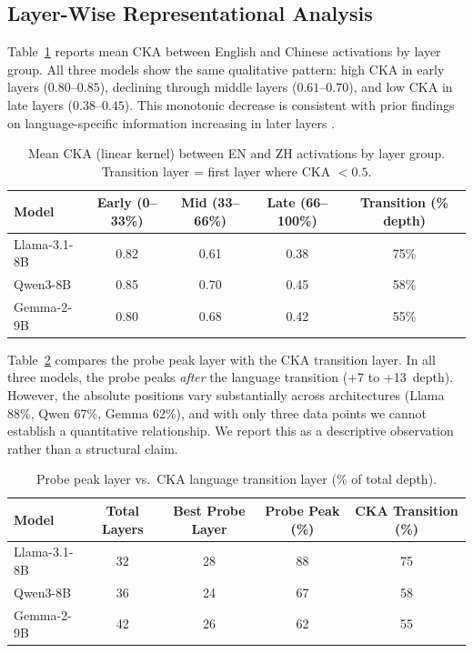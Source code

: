 \documentclass[11pt]{article}
\newcommand{\pp}{\,\text{pp}}
\begin{document}
\subsection{Layer-Wise Representational Analysis}
\label{sec:cka}

Table~\ref{tab:cka} reports mean CKA between English and Chinese activations by layer group.
All three models show the same qualitative pattern: high CKA in early layers ($0.80$--$0.85$), declining through middle layers ($0.61$--$0.70$), and low CKA in late layers ($0.38$--$0.45$).
This monotonic decrease is consistent with prior findings on language-specific information increasing in later layers \citep{libovicky2020language}.

\begin{table}[t]
\centering
\caption{Mean CKA (linear kernel) between EN and ZH activations by layer group. Transition layer = first layer where CKA $< 0.5$.}
\label{tab:cka}
\begin{tabular}{lcccc}
\toprule
Model & Early (0--33\%) & Mid (33--66\%) & Late (66--100\%) & Transition (\% depth) \\
\midrule
Llama-3.1-8B & 0.82 & 0.61 & 0.38 & 75\% \\
Qwen3-8B     & 0.85 & 0.70 & 0.45 & 58\% \\
Gemma-2-9B   & 0.80 & 0.68 & 0.42 & 55\% \\
\bottomrule
\end{tabular}
\end{table}

Table~\ref{tab:probe_layer} compares the probe peak layer with the CKA transition layer.
In all three models, the probe peaks \emph{after} the language transition (+7 to +13\pp{} depth).
However, the absolute positions vary substantially across architectures (Llama 88\%, Qwen 67\%, Gemma 62\%), and with only three data points we cannot establish a quantitative relationship.
We report this as a descriptive observation rather than a structural claim.

\begin{table}[t]
\centering
\caption{Probe peak layer vs.\ CKA language transition layer (\% of total depth).}
\label{tab:probe_layer}
\begin{tabular}{lcccc}
\toprule
Model & Total Layers & Best Probe Layer & Probe Peak (\%) & CKA Transition (\%) \\
\midrule
Llama-3.1-8B & 32 & 28 & 88 & 75 \\
Qwen3-8B     & 36 & 24 & 67 & 58 \\
Gemma-2-9B   & 42 & 26 & 62 & 55 \\
\bottomrule
\end{tabular}
\end{table}
\end{document}
